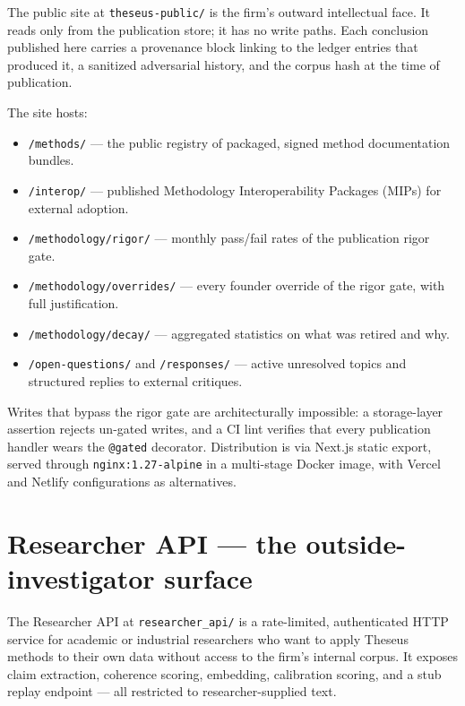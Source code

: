 \documentclass[11pt,letterpaper]{article}
\newcommand{\file}[1]{\texttt{#1}}
\begin{document}
The public site at \file{theseus-public/} is the firm's outward intellectual face. It reads only from the publication store; it has no write paths. Each conclusion published here carries a provenance block linking to the ledger entries that produced it, a sanitized adversarial history, and the corpus hash at the time of publication.

The site hosts:

\begin{itemize}[leftmargin=1.5em,itemsep=0.1em]
\item \file{/methods/} --- the public registry of packaged, signed method documentation bundles.
\item \file{/interop/} --- published Methodology Interoperability Packages (MIPs) for external adoption.
\item \file{/methodology/rigor/} --- monthly pass/fail rates of the publication rigor gate.
\item \file{/methodology/overrides/} --- every founder override of the rigor gate, with full justification.
\item \file{/methodology/decay/} --- aggregated statistics on what was retired and why.
\item \file{/open-questions/} and \file{/responses/} --- active unresolved topics and structured replies to external critiques.
\end{itemize}

Writes that bypass the rigor gate are architecturally impossible: a storage-layer assertion rejects un-gated writes, and a CI lint verifies that every publication handler wears the \texttt{@gated} decorator. Distribution is via Next.js static export, served through \texttt{nginx:1.27-alpine} in a multi-stage Docker image, with Vercel and Netlify configurations as alternatives.

\section{Researcher API --- the outside-investigator surface}

The Researcher API at \file{researcher\_api/} is a rate-limited, authenticated HTTP service for academic or industrial researchers who want to apply Theseus methods to their own data without access to the firm's internal corpus. It exposes claim extraction, coherence scoring, embedding, calibration scoring, and a stub replay endpoint --- all restricted to researcher-supplied text.
\end{document}
